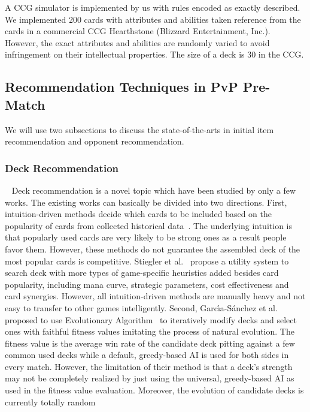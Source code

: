 A CCG simulator is implemented by us with rules encoded as exactly described. We implemented 200 cards with attributes and abilities taken reference from the cards in a commercial CCG Hearthstone (Blizzard Entertainment, Inc.). However, the exact attributes and abilities are randomly varied to avoid infringement on their intellectual properties. The size of a deck is 30 in the CCG.    


\subsection{Recommendation Techniques in PvP Pre-Match}
We will use two subsections to discuss the state-of-the-arts in initial item recommendation and opponent recommendation.


\subsubsection{Deck Recommendation}~\label{deckrec_prev}
Deck recommendation is a novel topic which have been studied by only a few works. The existing works can basically be divided into two directions. First, intuition-driven methods decide which cards to be included based on the popularity of cards from collected historical data~\cite{frankkarsten,willfancher}. The underlying intuition is that popularly used cards are very likely to be strong ones as a result people favor them. However, these methods do not guarantee the assembled deck of the most popular cards is competitive. Stiegler et al.~\cite{stiegler2016hearthstone} propose a utility system to search deck with more types of game-specific heuristics added besides card popularity, including mana curve, strategic parameters, cost effectiveness and card synergies. However, all intuition-driven methods are manually heavy and not easy to transfer to other games intelligently. Second, Garc{\'\i}a-S{\'a}nchez et al.~\cite{garcia2016evolutionary} proposed to use Evolutionary Algorithm~\cite{simon2013evolutionary} to iteratively modify decks and select ones with faithful fitness values imitating the process of natural evolution. The fitness value is the average win rate of the candidate deck pitting against a few common used decks while a default, greedy-based AI is used for both sides in every match. However, the limitation of their method is that a deck's strength may not be completely realized by just using the universal, greedy-based AI as used in the fitness value evaluation. Moreover, the evolution of candidate decks is currently totally random
